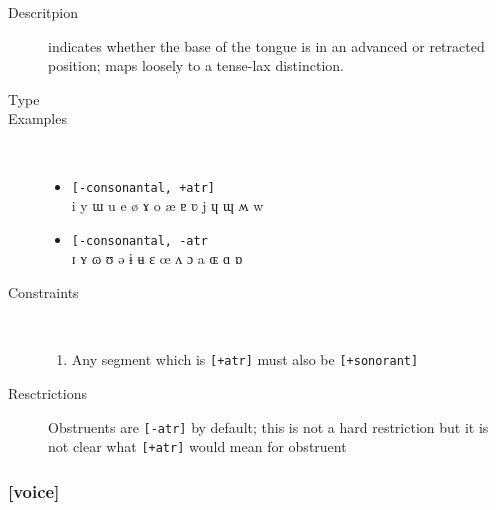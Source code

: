 \documentclass[10pt,letterpaper]{article}
\begin{document}
\begin{description}
\item[Descritpion] indicates whether the base of the tongue is in an advanced or retracted position; maps loosely to a tense-lax distinction.
\item[Type]
\item[Examples]\ 
  \begin{itemize}
    \item \texttt{[-consonantal, +atr]}\\
    i y ɯ u e ø ɤ o æ ɐ ʋ j ɥ ɰ ʍ w 
    \item \texttt{[-consonantal, -atr}\\
    ɪ ʏ ɷ ʊ ə ɨ ʉ ɛ œ ʌ ɔ a ɶ ɑ ɒ
  \end{itemize}
\item[Constraints]\
  \begin{enumerate}
    \item Any segment which is \texttt{[+atr]} must also be \texttt{[+sonorant]}
  \end{enumerate}
\item[Resctrictions] Obstruents are \texttt{[-atr]} by default; this is not a hard restriction but it is not clear what \texttt{[+atr]} would mean for obstruent\\
\end{description}

\subsubsection{[voice]}
\label{ssub:feature_voice}

\end{document}
